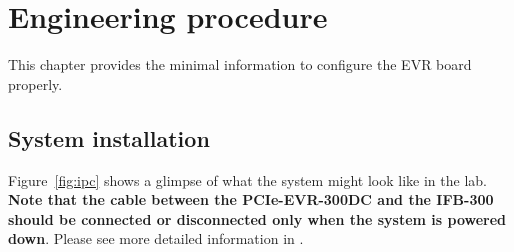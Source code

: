 \documentclass[11pt
  , a4paper
  , article
  , oneside
  , showtrims
]{memoir}
\begin{document}
\chapter{Engineering procedure}
This chapter provides the minimal information to configure the EVR board properly.\\

\section{System installation}
Figure~\ref{fig:ipc} shows a glimpse of what the system might look like in the lab. \textbf{Note that the cable between the PCIe-EVR-300DC and the IFB-300 should be connected or disconnected only when the system is powered down}. Please see more detailed information in \citep[][p54]{MRFEVENTSYSTEMDC}.\\
\end{document}
